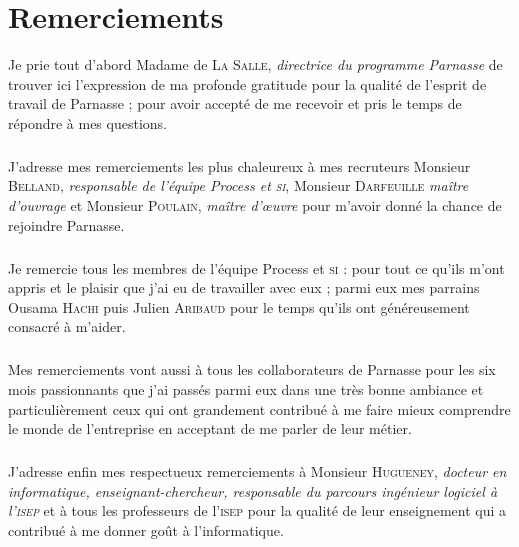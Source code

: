 \chapter{Remerciements}

Je prie tout d'abord Madame de \textsc{La Salle}, \textsl{directrice du programme Parnasse}
de trouver ici l'expression de ma profonde gratitude pour la qualité de l'esprit de travail de Parnasse ; pour avoir accepté de me recevoir et pris le temps de répondre à mes questions.

\paragraph[Recruteurs]{} J'adresse mes remerciements les plus chaleureux à mes recruteurs
Monsieur \textsc{Belland}, \textsl{responsable de l'équipe Process et \textsc{si}}, Monsieur \textsc{Darfeuille} \textsl{maître d'ouvrage} et Monsieur \textsc{Poulain}, \textsl{maître d'œuvre} pour m'avoir donné la chance de rejoindre Parnasse.

%
%
%
%

\paragraph[Equipe Process et \textsc{si}]{} Je remercie tous les membres de l'équipe Process et \textsc{si} :
\iftoggle{isReport}{
{membres.private.tex}%
}{%
}%
pour tout ce qu'ils m'ont appris et le plaisir que j'ai eu de travailler avec eux ; parmi eux mes parrains
Ousama \textsc{Hachi} puis Julien \textsc{Aribaud}
pour le temps qu'ils ont généreusement consacré à m'aider.

\paragraph[Collaborateurs de Parnasse]{} Mes remerciements vont aussi à tous les collaborateurs de Parnasse pour les six mois passionnants que j'ai passés parmi eux dans une très bonne ambiance et particulièrement ceux qui ont grandement contribué à me faire mieux comprendre le monde de l'entreprise en acceptant de me parler de leur métier.

\paragraph[Professeurs de l'\textsc{isep}]{} J'adresse enfin mes respectueux remerciements à
Monsieur \textsc{Hugueney}, \textsl{docteur en informatique, enseignant-chercheur, responsable du parcours \emph{ingénieur logiciel} à l'\textsc{isep}}
et à tous les professeurs de l'\textsc{isep} pour la qualité de leur enseignement qui a contribué à me donner goût à l'informatique.